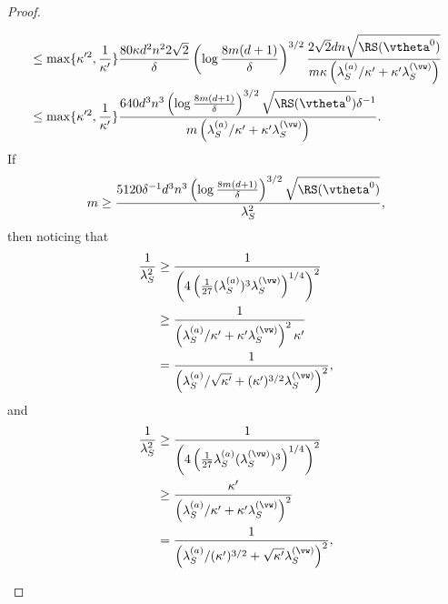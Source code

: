 \documentclass{article}
\begin{document}
\begin{proof}
\begin{enumerate}[(a)]
\begin{enumerate}[(i)]
\begin{equation}
\begin{aligned}
                                 & \leq \max\{\kappa'^2,\frac{1}{\kappa'}\}\frac{80\kappa d^2n^2 2\sqrt{2}}{\delta}\left(\log\frac{8m(d+1)}{\delta}\right)^{3/2}\frac{2\sqrt{2}dn\sqrt{\RS(\vtheta^0)}}{m\kappa\left(\lambda_S^{(a)}/\kappa'+\kappa'\lambda_S^{(\vw)}\right)} \\
                                 & \leq\max\{\kappa'^2,\frac{1}{\kappa'}\}\frac{640 d^3n^3\left(\log\frac{8m(d+1)}{\delta}\right)^{3/2}\sqrt{\RS(\vtheta^0)}\delta^{-1}}{m\left(\lambda_S^{(a)}/\kappa'+\kappa'\lambda_S^{(\vw)}\right)}.
                            \end{aligned}
                        \end{equation}
                        If
                        \begin{equation}
                            m\geq\frac{5120\delta^{-1}d^3n^3\left(\log\frac{8m(d+1)}{\delta}\right)^{3/2}\sqrt{\RS(\vtheta^0)}}{\lambda_S^2},
                        \end{equation}
                        then noticing that
                        \begin{equation}
                            \begin{aligned}
                                \frac{1}{\lambda_S^2}
                                 & \geq\frac{1}{\left(4\left(\frac{1}{27}(\lambda_S^{(a)})^3\lambda_S^{(\vw)}\right)^{1/4}\right) ^2} \\
                                 & \geq\frac{1}{\left(\lambda_S^{(a)}/\kappa'+\kappa'\lambda_S^{(\vw)}\right)^2\kappa'}               \\
                                 & =\frac{1}{\left(\lambda_S^{(a)}/\sqrt{\kappa'}+(\kappa')^{3/2}\lambda_S^{(\vw)}\right)^2},
                            \end{aligned}
                        \end{equation}
                        and
                        \begin{equation}
                            \begin{aligned}
                                \frac{1}{\lambda_S^2}
                                 & \geq\frac{1}{\left(4\left(\frac{1}{27}\lambda_S^{(a)}(\lambda_S^{(\vw)})^3\right)^{1/4}\right) ^2} \\
                                 & \geq\frac{\kappa'}{\left(\lambda_S^{(a)}/\kappa'+\kappa'\lambda_S^{(\vw)}\right)^2}                \\
                                 & =\frac{1}{\left(\lambda_S^{(a)}/(\kappa')^{3/2}+\sqrt{\kappa'}\lambda_S^{(\vw)}\right)^2},

\end{aligned}
\end{equation}
\end{enumerate}
\end{enumerate}
\end{proof}
\end{document}
